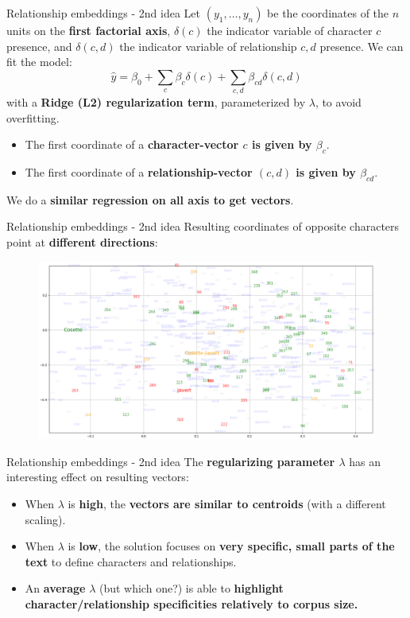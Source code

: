 \documentclass[10pt]{beamer}
\newcommand{\imp}[1]{\textbf{\color{cyan}#1}}
\begin{document}
	\begin{frame}{Relationship embeddings - 2nd idea}
		Let $(y_1, \ldots, y_n)$ be the coordinates of the $n$ units on the \imp{first factorial axis}, $\delta(c)$ the indicator variable of character $c$ presence, and $\delta(c,d)$ the indicator variable of relationship $c,d$ presence. We can fit the model:
		$$
		\hat{y} = \beta_0 + \sum_{c} \beta_c \delta(c) + \sum_{c,d} \beta_{cd} \delta(c,d)
		$$
		with a \imp{Ridge (L2) regularization term}, parameterized by $\lambda$, to avoid overfitting.
		\begin{itemize}
		\item The first coordinate of a \imp{character-vector $c$ is given by $\beta_c$}.
		\item The first coordinate of a \imp{relationship-vector $(c,d)$ is given by $\beta_{cd}$}.
		\end{itemize}
		We do a \imp{similar regression on all axis to get vectors}.
	\end{frame}
	
	
	\begin{frame}{Relationship embeddings - 2nd idea}
		Resulting coordinates of opposite characters point at \imp{different directions}:
		\begin{figure}
			\centering
			\includegraphics[width=\textwidth]{img/reg_embeddings.png}
		\end{figure}
	\end{frame}
	
	
	\begin{frame}{Relationship embeddings - 2nd idea}
		The \imp{regularizing parameter $\lambda$} has an interesting effect on resulting vectors:
		\begin{itemize}
			\item When $\lambda$ is \imp{high}, the \imp{vectors are similar to centroids} (with a different scaling).
			\item When $\lambda$ is \imp{low}, the solution focuses on \imp{very specific, small parts of the text} to define characters and relationships.
			\item An \imp{average} $\lambda$ (but which one?) is able to \imp{highlight character/relationship specificities relatively to corpus size.}
		\end{itemize}
	\end{frame}
	
\end{document}
